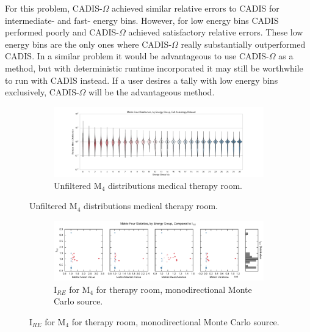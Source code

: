 For this problem, CADIS-$\Omega$ achieved similar relative errors to CADIS for
intermediate- and fast- energy bins. However, for low energy bins CADIS
performed poorly and CADIS-$\Omega$ achieved satisfactory relative errors. These
low energy bins are the only ones where CADIS-$\Omega$ really substantially
outperformed CADIS. In a similar problem it would be advantageous to use
CADIS-$\Omega$ as a method, but with deterministic runtime incorporated it may
still be worthwhile to run with CADIS instead. If a user desires a tally with
low energy bins exclusively, CADIS-$\Omega$ will be the advantageous method.

\begin{figure}[htb!]
  \centering
  \begin{subfigure}[t]{\textwidth}
    \includegraphics[width=\linewidth]{./chapters/characterization_probs/figures/char/therapy_iso/metric_four_violin_full.pdf}
    \caption{Unfiltered M$_4$ distributions medical therapy room.}
    \label{fig:M4violintherapy}
  \end{subfigure}
\end{figure}
\begin{figure}[htb!]\ContinuedFloat
  \centering
  \begin{subfigure}[t]{\textwidth}
    \includegraphics[width=\linewidth]{./chapters/characterization_probs/figures/char/therapy/metric_four_err_stats_full.pdf}
    \caption{I$_{RE}$ for M$_4$ for therapy room, monodirectional Monte Carlo
  source.}
    \label{fig:M4statsmonotherapy}
  \end{subfigure}
\end{figure}
